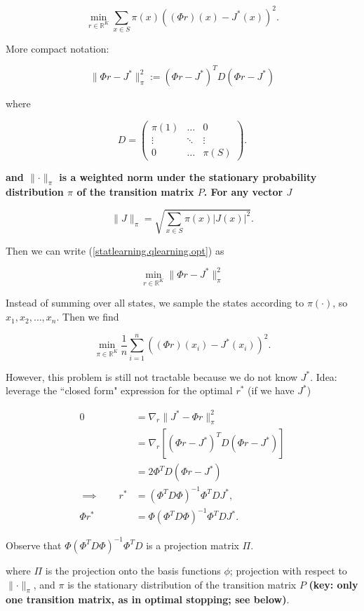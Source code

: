 \begin{equation}\label{statlearning.qlearning.opt}
\min_{r \in \mathbb{R}^K} \sum_{x \in S} \pi(x) \left( (\Phi r)(x) - J^*(x) \right)^2.
\end{equation}

More compact notation:

\[
\lVert \Phi r - J^* \rVert_\pi^2 := (\Phi r - J^*)^T D ( \Phi r - J^*)
\]

where

\[
D = \begin{pmatrix}
\pi(1) & \ldots & 0 \\
\vdots & \ddots & \vdots \\
0 & \ldots & \pi(S)
\end{pmatrix}.
\]

\textbf{and \(\lVert \cdot \rVert_\pi\) is a weighted norm under the stationary probability distribution \(\pi\) of the transition matrix \(P\). For any vector \(J\)}

\[
\lVert J \rVert_\pi = \sqrt{\sum_{x \in S} \pi(x) | J(x)|^2 }.
\]

 Then we can write (\ref{statlearning.qlearning.opt}) as

\[
\min_{r \in \mathbb{R}^K} \lVert \Phi r - J^* \rVert_\pi^2
\]

Instead of summing over all states, we sample the states according to \(\pi(\cdot)\), so \(x_1, x_2, \ldots, x_n\). Then we find

\[
\min_{\pi \in \mathbb{R}^K} \frac{1}{n} \sum_{i =1}^n \left( (\Phi r)(x_i) - J^*(x_i)  \right)^2.
\]

However, this problem is still not tractable because we do not know \(J^*\). Idea: leverage the ``closed form" expression for the optimal \(r^*\) (if we have \(J^*\))

\begin{align*}
0  & = \nabla_r \lVert J^* - \Phi r \rVert_\pi^2 
\\ & = \nabla_r \left[ (\Phi r - J^*)^T D ( \Phi r - J^*) \right] 
\\ & = 2 \Phi^TD(\Phi r - J^*)
\\ \implies \qquad r^* & = (\Phi^T D \Phi)^{-1} \Phi^T D J^*, 
\\ \Phi r^* & = \Phi  (\Phi^T D \Phi)^{-1} \Phi^T D J^*.
\end{align*}

Observe that \(\Phi  (\Phi^T D \Phi)^{-1} \Phi^T D \) is a projection matrix \(\Pi\).

where \(\Pi\) is the projection onto the basis functions \(\phi\); projection with respect to \(\lVert \cdot \rVert_\pi\), and \(\pi\) is the stationary distribution of the transition matrix \(P\) \textbf{(key: only one transition matrix, as in optimal stopping; see below)}.



